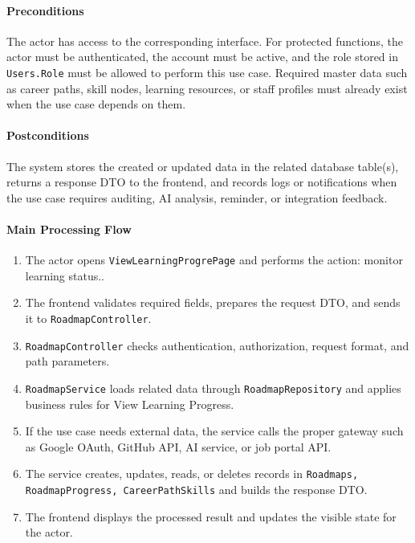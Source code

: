 \paragraph{Preconditions}

The actor has access to the corresponding interface. For protected functions, the actor must be authenticated, the account must be active, and the role stored in \texttt{Users.Role} must be allowed to perform this use case. Required master data such as career paths, skill nodes, learning resources, or staff profiles must already exist when the use case depends on them.

\paragraph{Postconditions}

The system stores the created or updated data in the related database table(s), returns a response DTO to the frontend, and records logs or notifications when the use case requires auditing, AI analysis, reminder, or integration feedback.

\paragraph{Main Processing Flow}

\begin{enumerate}
    \item The actor opens \texttt{ViewLearningProgrePage} and performs the action: monitor learning status..
    \item The frontend validates required fields, prepares the request DTO, and sends it to \texttt{RoadmapController}.
    \item \texttt{RoadmapController} checks authentication, authorization, request format, and path parameters.
    \item \texttt{RoadmapService} loads related data through \texttt{RoadmapRepository} and applies business rules for View Learning Progress.
    \item If the use case needs external data, the service calls the proper gateway such as Google OAuth, GitHub API, AI service, or job portal API.
    \item The service creates, updates, reads, or deletes records in \texttt{Roadmaps, RoadmapProgress, CareerPathSkills} and builds the response DTO.
    \item The frontend displays the processed result and updates the visible state for the actor.
\end{enumerate}


